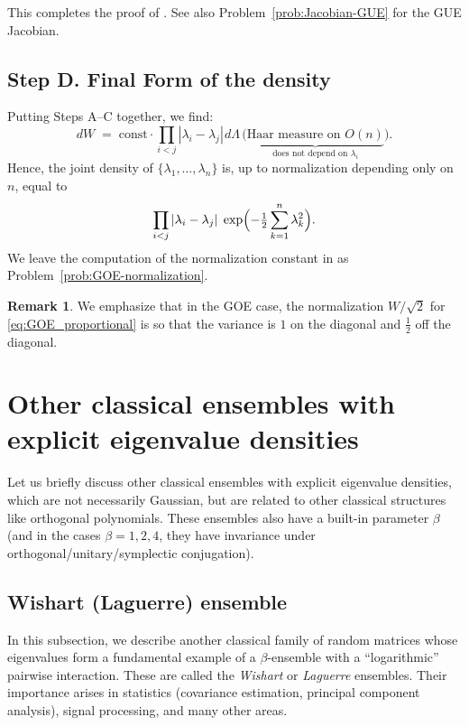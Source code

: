 \documentclass[letterpaper,11pt,oneside,reqno]{article}
\numberwithin{equation}{section}
\newcommand{\ssp}{\hspace{1pt}}
\theoremstyle{definition}
\newtheorem{remark}[proposition]{Remark}
\begin{document}
This completes the proof of 
.
See also Problem~\ref{prob:Jacobian-GUE} for the GUE Jacobian.

\subsection{Step D. Final Form of the density}
\label{subsec:final-form}

Putting Steps A--C together, we find:
\[
  dW
  \;=\;
	\mathrm{const}\cdot
  \prod_{i<j}|\lambda_i-\lambda_j|\ssp
  d\Lambda
  \,\bigl(\underbrace{\text{Haar measure on }O(n)}_{\text{does not depend on }\lambda_i}\bigr).
\]
Hence, the joint density of \(\{\lambda_1,\dots,\lambda_n\}\) is,
up to normalization depending only on \(n\), equal to
\begin{equation}
	\label{eq:GOE_proportional}
  \prod_{i<j}|\lambda_i-\lambda_j|\;
  \exp\Bigl(-\tfrac{1}{2}\sum_{k=1}^n \lambda_k^2\Bigr).
\end{equation}
We leave the computation of the normalization constant in
 as Problem~\ref{prob:GOE-normalization}.

\begin{remark}
	We emphasize that in the GOE case, the normalization $W/\sqrt 2$ for 
	\eqref{eq:GOE_proportional} 
	is so that the variance is $1$ on the diagonal and 
	$\frac{1}{2}$ off the diagonal. 
\end{remark}

\section{Other classical ensembles with explicit eigenvalue densities}
\label{sec:other-ensembles}

Let us briefly discuss other classical ensembles with explicit eigenvalue densities,
which are not necessarily Gaussian,
but are related to other classical structures
like orthogonal polynomials. These ensembles
also have 
a built-in parameter $\beta$ (and in the cases $\beta=1,2,4$, they have 
invariance under orthogonal/unitary/symplectic conjugation).


\subsection{Wishart (Laguerre) ensemble}
\label{sec:Wishart}

In this subsection, we describe another classical family of random matrices whose eigenvalues form a fundamental example of a $\beta$-ensemble with a ``logarithmic'' pairwise interaction. These are called the \emph{Wishart} or \emph{Laguerre} ensembles. Their importance arises in statistics (covariance estimation, principal component analysis), signal processing, and many other areas.
\end{document}
